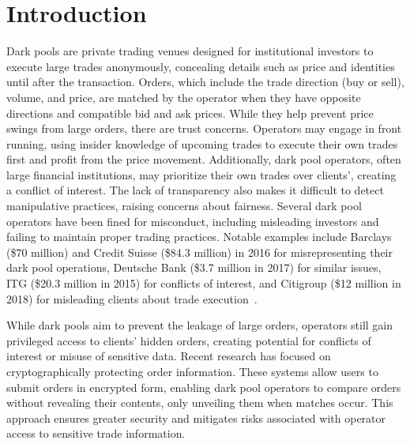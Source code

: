 \section{Introduction}
Dark pools are private trading venues designed for institutional investors to execute large trades anonymously, concealing details such as price and identities until after the transaction. Orders, which include the trade direction (buy or sell), volume, and price, are matched by the operator when they have opposite directions and compatible bid and ask prices. While they help prevent price swings from large orders, there are trust concerns. Operators may engage in front running, using insider knowledge of upcoming trades to execute their own trades first and profit from the price movement. Additionally, dark pool operators, often large financial institutions, may prioritize their own trades over clients', creating a conflict of interest. The lack of transparency also makes it difficult to detect manipulative practices, raising concerns about fairness. Several dark pool operators have been fined for misconduct, including misleading investors and failing to maintain proper trading practices. Notable examples include Barclays (\$70 million) and Credit Suisse (\$84.3 million) in 2016 for misrepresenting their dark pool operations, Deutsche Bank (\$3.7 million in 2017) for similar issues, ITG (\$20.3 million in 2015) for conflicts of interest, and Citigroup (\$12 million in 2018) for misleading clients about trade execution~\cite{fines}.

While dark pools aim to prevent the leakage of large orders, operators still gain privileged access to clients' hidden orders, creating potential for conflicts of interest or misuse of sensitive data. Recent research has focused on cryptographically protecting order information. These systems allow users to submit orders in encrypted form, enabling dark pool operators to compare orders without revealing their contents, only unveiling them when matches occur. This approach ensures greater security and mitigates risks associated with operator access to sensitive trade information. 

